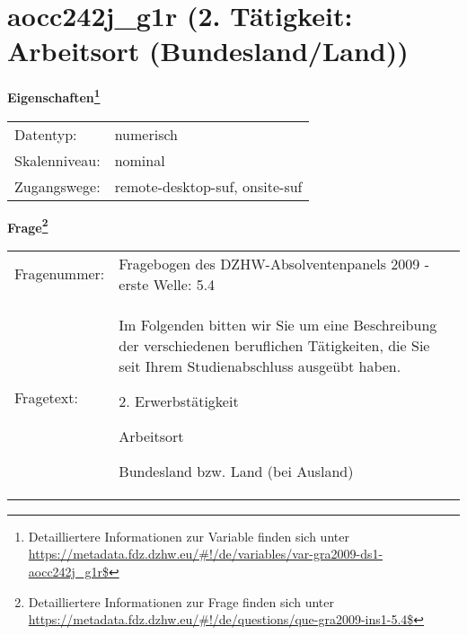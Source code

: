 
    \setcounter{footnote}{0}

    \vspace*{-1.8cm}
	\section{aocc242j\_g1r (2. Tätigkeit: Arbeitsort (Bundesland/Land))}
	\label{section:aocc242j_g1r}



    \vspace*{0.5cm}
    \noindent\textbf{Eigenschaften\footnote{Detailliertere Informationen zur Variable finden sich unter
		\url{https://metadata.fdz.dzhw.eu/\#!/de/variables/var-gra2009-ds1-aocc242j_g1r$}}}\\
	\begin{tabularx}{\hsize}{@{}lX}
	Datentyp: & numerisch \\
	Skalenniveau: & nominal \\
	Zugangswege: &
	  remote-desktop-suf, 
	  onsite-suf
 \\
    \end{tabularx}



				\vspace*{0.5cm}
                \noindent\textbf{Frage\footnote{Detailliertere Informationen zur Frage finden sich unter
		              \url{https://metadata.fdz.dzhw.eu/\#!/de/questions/que-gra2009-ins1-5.4$}}}\\
				\begin{tabularx}{\hsize}{@{}lX}
					Fragenummer: &
					  Fragebogen des DZHW-Absolventenpanels 2009 - erste Welle:
					  5.4
 \\
					Fragetext: & Im Folgenden bitten wir Sie um eine Beschreibung der verschiedenen beruflichen Tätigkeiten, die Sie seit Ihrem Studienabschluss ausgeübt haben.\par  2. Erwerbstätigkeit\par  Arbeitsort\par  Bundesland bzw. Land (bei Ausland) \\
				\end{tabularx}





